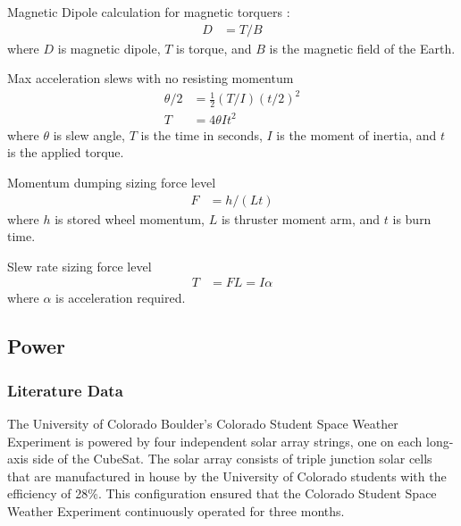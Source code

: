 Magnetic Dipole calculation for magnetic torquers \cite{SMAD}:
\begin{align}
	D &= T/B
\end{align}
where $D$ is magnetic dipole, $T$ is torque, and $B$ is the magnetic field of the Earth.  

Max acceleration slews with no resisting momentum\cite{SMAD}
\begin{align}
	\theta/2 &= \tfrac{1}{2}(T/I)(t/2)^2\\
	T &= 4\theta I t^2
\end{align}
where $\theta$ is slew angle, $T$ is the time in seconds, $I$ is the moment of inertia, and $t$ is the applied torque.

Momentum dumping sizing force level\cite{SMAD}
\begin{align}
	F &= h/(Lt)
\end{align}
where $h$ is stored wheel momentum, $L$ is thruster moment arm, and $t$ is burn time.

Slew rate sizing force level\cite{SMAD}
\begin{align}
	T &= FL = I\alpha
\end{align}
where $\alpha$ is acceleration required.

\subsection{Power}
\subsubsection{Literature Data}
The University of Colorado Boulder's Colorado Student Space Weather Experiment is powered by four independent solar array strings, one on each long-axis side of the CubeSat. The solar array consists of triple junction solar cells that are manufactured in house by the University of Colorado students with the efficiency of 28\%\cite{UCB_EPS}. This configuration ensured that the Colorado Student Space Weather Experiment continuously operated for three months.  
